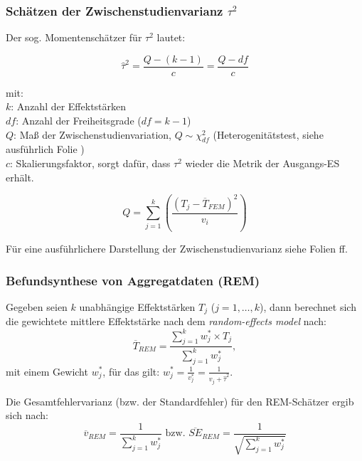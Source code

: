\begin{frame}[plain]
  \frametitle{Schätzen der Zwischenstudienvarianz $\tau^2$}

  Der sog. Momentenschätzer für $\tau^2$ lautet:

  \begin{equation}
    \widehat{\tau}^2 = \frac{Q-(k-1)}{c} =  \frac{Q-df}{c}
  \end{equation}

  mit:\\
  $k$: Anzahl der Effektstärken\\
  $df$: Anzahl der Freiheitsgrade ($df = k-1$)\\
  $Q$: Maß der Zwischenstudienvariation, $Q \sim \chi_{df}^2$
       (Heterogenitätstest, siehe ausführlich Folie \pageref{sec:die-q-statistik}) \\
  $c$: Skalierungsfaktor, sorgt dafür, dass $\tau^2$ wieder die Metrik der
  Ausgangs-ES erhält.

  \begin{equation}
    Q = \sum\limits^k_{j = 1}\left(\frac{(T_j - \overline{T}_{FEM})^2}{v_i}\right)
  \end{equation}

  Für eine ausführlichere Darstellung der Zwischenstudienvarianz siehe Folien \pageref{sec:tau}ff.

\end{frame}



\begin{frame}
  \frametitle{Befundsynthese von Aggregatdaten (REM)}
  Gegeben seien $k$ unabhängige Effektstärken $T_j$ ($j = 1, \ldots,k$), dann
  berechnet sich die gewichtete mittlere Effektstärke nach dem \emph{random-effects model} nach:
  \begin{equation}
    \overline{T}_{REM} = \frac{\sum\limits^k_{j=1}{w^*_j \times T_j}}{\sum\limits^k_{j=1}{w^*_j}},
  \end{equation}
  mit einem Gewicht $w^*_j$, für das gilt: $w^*_j = \frac{1}{v_j^*} = \frac{1}{v_j+\widehat{\tau}^2}$.

  Die Gesamtfehlervarianz (bzw. der Standardfehler) für den REM-Schätzer ergib
  sich nach:
  \begin{equation*}
    \overline{v}_{REM} = \frac{1}{\sum^k_{j=1}w^*_j} \text{ bzw. }  \overline{SE}_{REM} = \frac{1}{\sqrt{\sum^k_{j=1}w^*_j}}
  \end{equation*}
\end{frame}







